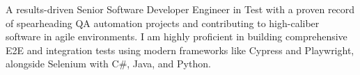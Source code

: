A results-driven Senior Software Developer Engineer in Test with a proven record of spearheading QA automation projects and contributing to high-caliber software in agile environments. I am highly proficient in building comprehensive E2E and integration tests using modern frameworks like Cypress and Playwright, alongside Selenium with C\#, Java, and Python.


